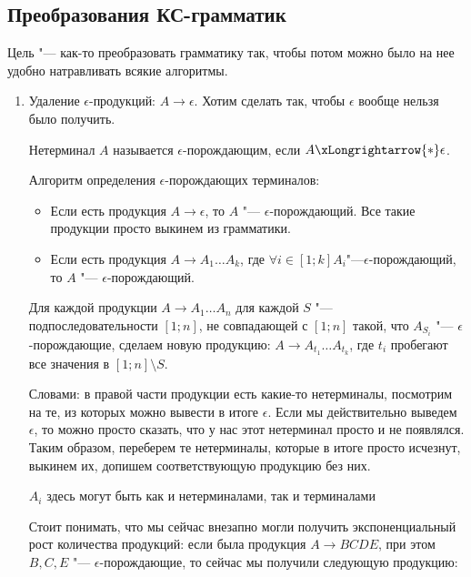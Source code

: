 
\subsection{Преобразования КС-грамматик}
Цель "--- как-то преобразовать грамматику так, чтобы потом можно было на нее удобно натравливать всякие алгоритмы.

\begin{enumerate}
\item
Удаление $\epsilon$-продукций: $A \to \epsilon$. Хотим сделать так, чтобы $\epsilon$ вообще нельзя было получить.

\begin{Def}
Нетерминал $A$ называется $\epsilon$-порождающим, если $A \xLongrightarrow{*} \epsilon$.

Алгоритм определения $\epsilon$-порождающих терминалов:
\begin{itemize}
\item
Если есть продукция $A \to \epsilon$, то $A$ "--- $\epsilon$-порождающий. Все такие продукции просто выкинем из грамматики.

\item
Если есть продукция $A \to A_1 \dots A_k$, где $\forall i \in [1; k] A_i$"---$\epsilon$-порождающий, то $A$ "--- $\epsilon$-порождающий.
\end{itemize}
\end{Def}

Для каждой продукции $A \to A_1 \dots A_n$ для каждой $S$ "--- подпоследовательности $[1; n]$, не совпадающей с $[1; n]$ такой, что $A_{S_i}$ "--- $\epsilon$-порождающие, сделаем новую продукцию:
$A \to A_{t_1} \dots A_{t_k}$, где $t_i$ пробегают все значения в $[1; n] \setminus S$.

Словами: в правой части продукции есть какие-то нетерминалы, посмотрим на те, из которых можно вывести в итоге $\epsilon$. 
Если мы действительно выведем $\epsilon$, то можно просто сказать, что у нас этот нетерминал просто и не появлялся. 
Таким образом, переберем те нетерминалы, которые в итоге просто исчезнут, выкинем их, допишем соответствующую продукцию без них.
\begin{Rem}
$A_i$ здесь могут быть как и нетерминалами, так и терминалами
\end{Rem}
\begin{Rem}
Стоит понимать, что мы сейчас внезапно могли получить экспоненциальный рост количества продукций: если была продукция $A \to BCDE$, при этом $B, C, E$ "--- $\epsilon$-порождающие, то сейчас
мы получили следующую продукцию: 


\end{Rem}
\end{enumerate}
